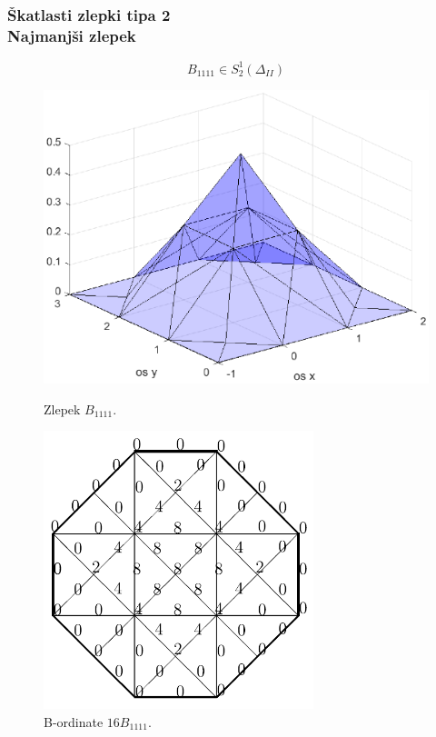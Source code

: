\documentclass{beamer}
\begin{document}
\begin{frame}
\frametitle{Škatlasti zlepki tipa 2 \\ Najmanjši zlepek}

$$B_{1111} \in S_2^1(\Delta_{II})$$



\begin{figure}
    \centering
    \begin{minipage}{0.45\textwidth}
        \centering
        \includegraphics[width=1\textwidth]{B1111} %
        \caption{Zlepek $B_{1111}$.}
    \end{minipage}\hfill
    \begin{minipage}{0.45\textwidth}
        \centering
        \includegraphics[width=0.7\textwidth]{B1111a} %
        \caption{B-ordinate $16 B_{1111}$.}
    \end{minipage}
\end{figure}

\end{frame}
\end{document}
